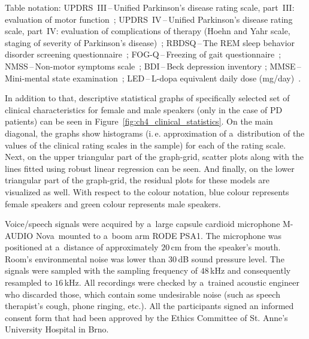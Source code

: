 \begin{table}[htb!]
\begin{threeparttable}
		\begin{tablenotes}
			\scriptsize
			\item Table notation: UPDRS~III\,--\,Unified Parkinson's disease rating scale, part~III: evaluation of motor function~\cite{Fahn1987}; UPDRS~IV\,--\,Unified Parkinson's disease rating scale, part~IV: evaluation of complications of therapy (Hoehn and Yahr scale, staging of severity of Parkinson's disease)~\cite{Fahn1987}; RBDSQ\,--\,The REM sleep behavior disorder screening questionnaire~\cite{Stiasny2007}; FOG-Q\,--\,Freezing of gait questionnaire~\cite{Giladi2000}; NMSS\,--\,Non-motor symptoms scale~\cite{Chaudhuri2007}; BDI\,--\,Beck depression inventory \cite{Beck2000, Beck1961}; MMSE\,--\,Mini-mental state examination~\cite{Folstein1975}; LED\,--\,L-dopa equivalent daily dose (mg/day)~\cite{Lee2010}.
		\end{tablenotes}
	\end{threeparttable}
\end{table}

In addition to that, descriptive statistical graphs of specifically selected set of clinical characteristics for female and male speakers (only in the case of PD patients) can be seen in Figure~\ref{fig:ch4_clinical_statistics}. On the main diagonal, the graphs show histograms (i.\,e. approximation of a~distribution of the values of the clinical rating scales in the sample) for each of the rating scale. Next, on the upper triangular part of the graph-grid, scatter plots along with the lines fitted using robust linear regression can be seen. And finally, on the lower triangular part of the graph-grid, the residual plots for these models are visualized as well. With respect to the colour notation, blue colour represents female speakers and green colour represents male speakers.

Voice/speech signals were acquired by a~large capsule cardioid microphone M-AUDIO Nova~mounted to a~boom arm RODE PSA1. The microphone was positioned at a~distance of approximately $20$\,cm from the speaker's mouth. Room's environmental noise was lower than $30$\,dB sound pressure level. The signals were sampled with the sampling frequency of $48$\,kHz and consequently resampled to $16$\,kHz. All recordings were checked by a~trained acoustic engineer who discarded those, which contain some undesirable noise (such as speech therapist's cough, phone ringing, etc.). All the participants signed an informed consent form that had been approved by the Ethics Committee of St. Anne's University Hospital in Brno.

